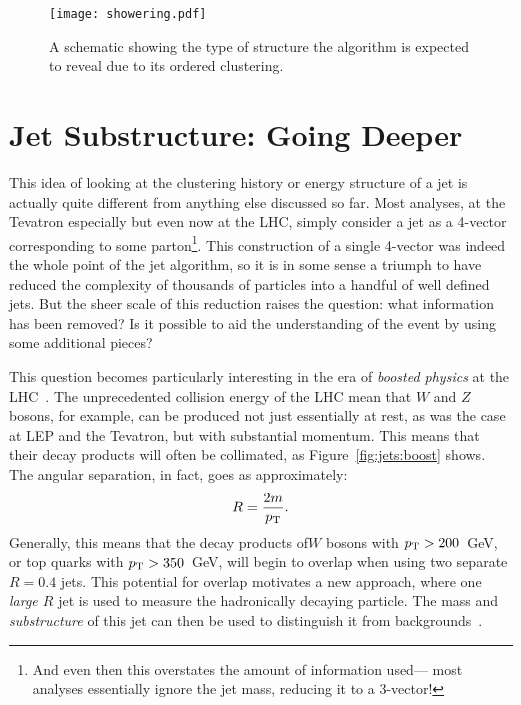 
\begin{figure}
\centering
\texttt{[image: showering.pdf]}
\caption{A schematic showing the type of structure the \kt algorithm is expected to reveal due to its \pt ordered clustering.}
\label{fig:jets:showering}
\end{figure}



\section{Jet Substructure: Going Deeper}

This idea of looking at the clustering history or energy structure  of a jet is actually quite different from anything else discussed so far. Most analyses, at the Tevatron especially but even now at the LHC, simply consider a jet as a 4-vector corresponding to some parton\footnote{And even then this overstates the amount of information used--- most analyses essentially ignore the jet mass, reducing it to a 3-vector!}. This construction of a single 4-vector was indeed the whole point of the jet algorithm, so it is in some sense a triumph to have reduced the complexity of thousands of particles into a handful of well defined jets. But the sheer scale of this reduction raises the question: what information has been removed? Is it possible to aid the understanding of the event by using some additional pieces?

This question becomes particularly interesting in the era of \textit{boosted physics} at the LHC~\cite{Abdesselam:2010pt,Altheimer:2012mn,Altheimer:2013yza,Adams:2015hiv}. The unprecedented collision energy of the LHC mean that $W$ and $Z$ bosons, for example, can be produced not just essentially at rest, as was the case at LEP and the Tevatron, but with substantial momentum. This means that their decay products will often be collimated, as Figure~\ref{fig:jets:boost} shows. The angular separation, in fact, goes as approximately:
%
\begin{equation}
R = \frac{2 m}{p_{\text{T}}}.
\end{equation}
%
Generally, this means that the decay products of$W$ bosons with $p_{\text{T}} > 200$~GeV, or top quarks with $p_{\text{T}} > 350$~GeV, will begin to overlap when using two separate $R=0.4$ jets. This potential for overlap motivates a new approach, where one \textit{large $R$} jet is used to measure the hadronically decaying particle. The mass and \textit{substructure} of this jet can then be used to distinguish it from backgrounds~\cite{Jetography}.

